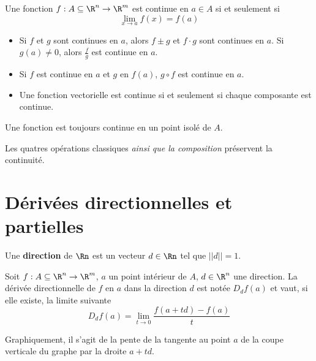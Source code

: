 \begin{mydef}[Continuité]
	Une fonction $f : A \subseteq \R^n \rightarrow \R^m$ est continue en $a \in A$ si et seulement si
	\[ \lim_{x \rightarrow a}f(x) = f(a) \]
\end{mydef}

\begin{myprop}\InsertTheoremBreak
	\begin{itemize}
		\item Si $f$ et $g$ sont continues en $a$, alors
			$f \pm g$ et $f \cdot g$ sont continues en $a$.
			Si $g(a) \neq 0$, alors $\frac{f}{g}$ est continue en $a$.

		\item Si $f$ est continue en $a$ et $g$ en $f(a)$,
			$g \circ f$ est continue en $a$.

		\item Une fonction vectorielle est continue si et seulement si chaque composante est continue.
	\end{itemize}
\end{myprop}

\begin{myrem}
	Une fonction est toujours continue en un point isolé de $A$.
\end{myrem}

\begin{myrem}
	Les quatres opérations classiques \emph{ainsi que la composition} préservent la continuité.
\end{myrem}




\section{Dérivées directionnelles et partielles}

\begin{mydef}
	Une \textbf{direction} de $\Rn$ est un vecteur $d \in \Rn$ tel que $||d|| = 1$.
\end{mydef}

\begin{mydef} Soit $f : A \subseteq \R^n \to \R^m$, $a$ un point intérieur de $A$, $d \in \R^n$ une direction. La dérivée directionnelle de $f$ en $a$ dans la direction $d$ est notée $D_df(a)$ et vaut, si elle existe, la limite suivante
	\[ D_df(a) = \lim_{t \to 0} \frac{f(a+td) - f(a)}{t} \]

	Graphiquement, il s'agit de la pente de la tangente au point $a$ de la coupe verticale du graphe
	par la droite $a+td$.
\end{mydef}

